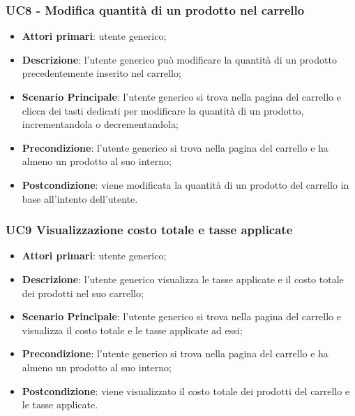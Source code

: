 \subsubsection{UC8 - Modifica quantità di un prodotto nel carrello}
\begin{itemize}
\item \textbf{Attori primari}: utente generico;
\item \textbf{Descrizione}: l'utente generico può modificare la quantità di un prodotto precedentemente inserito nel carrello;
\item \textbf{Scenario Principale}: l'utente generico si trova nella pagina del carrello e clicca dei tasti dedicati per modificare la quantità di un prodotto, incrementandola o decrementandola;
\item \textbf{Precondizione}: l'utente generico si trova nella pagina del carrello e ha almeno un prodotto al suo interno;
\item \textbf{Postcondizione}: viene modificata la quantità di un prodotto del carrello in base all'intento dell'utente.
\end{itemize}

\subsubsection{UC9 Visualizzazione costo totale e tasse applicate}
\begin{itemize}
\item \textbf{Attori primari}: utente generico;
\item \textbf{Descrizione}: l'utente generico visualizza le tasse applicate e il costo totale dei prodotti nel suo carrello;
\item \textbf{Scenario Principale}: l'utente generico si trova nella pagina del carrello e visualizza il costo totale e le tasse applicate ad essi;
\item \textbf{Precondizione}: l'utente generico si trova nella pagina del carrello e ha almeno un prodotto al suo interno;
\item \textbf{Postcondizione}: viene visualizzato il costo totale dei prodotti del carrello e le tasse applicate.
\end{itemize}




